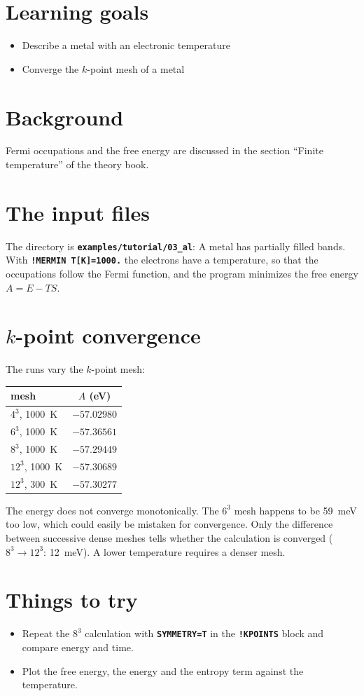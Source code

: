\documentclass[11pt,a4paper,oneside]{book}
\newcommand{\key}[1]{\textbf{\texttt{#1}}}
\newcommand{\file}[1]{\textbf{\texttt{#1}}}
\newcommand{\deck}[1]{{\small}}
\newcommand{\goals}{\section{Learning goals}}
\newcommand{\background}{\section{Background}}
\begin{document}
\goals
\begin{itemize}
\item Describe a metal with an electronic temperature
\item Converge the $k$-point mesh of a metal
\end{itemize}

\background
Fermi occupations and the free energy are discussed in the section
``Finite temperature'' of the theory book.

\section{The input files}

The directory is \file{examples/tutorial/03\_al}:
\deck{../../../examples/tutorial/03_al/al.strc}
\deck{../../../examples/tutorial/03_al/al.cntl}
A metal has partially filled bands. With \key{!MERMIN T[K]=1000.} the
electrons have a temperature, so that the occupations follow the Fermi
function, and the program minimizes the free energy $A=E-TS$.

\section{$k$-point convergence}

The runs vary the $k$-point mesh:
\begin{center}
\begin{tabular}{lc}\toprule
mesh & $A$ (eV) \\ \midrule
$4^3$, 1000~K & $-57.02980$ \\
$6^3$, 1000~K & $-57.36561$ \\
$8^3$, 1000~K & $-57.29449$ \\
$12^3$, 1000~K & $-57.30689$ \\
$12^3$, 300~K & $-57.30277$ \\ \bottomrule
\end{tabular}
\end{center}
The energy does not converge monotonically. The $6^3$ mesh happens to
be 59~meV too low, which could easily be mistaken for convergence. Only
the difference between successive dense meshes tells whether the
calculation is converged ($8^3\to12^3$: 12~meV). A lower temperature
requires a denser mesh.

\section{Things to try}
\begin{itemize}
\item Repeat the $8^3$ calculation with \key{SYMMETRY=T} in the
  \key{!KPOINTS} block and compare energy and time.
\item Plot the free energy, the energy and the entropy term against the
  temperature.
\end{itemize}
\end{document}
